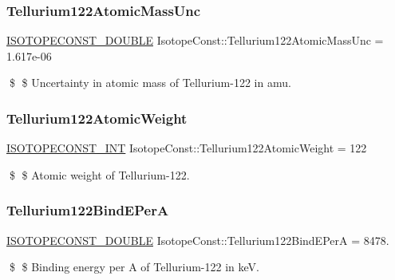 \subsubsection{\texorpdfstring{Tellurium122\+Atomic\+Mass\+Unc}{Tellurium122AtomicMassUnc}}
{\footnotesize\ttfamily \mbox{\hyperlink{group___isotope_const-_macros_ga8f45a7272ce02c0b4c65c44636ed719a}{I\+S\+O\+T\+O\+P\+E\+C\+O\+N\+S\+T\+\_\+\+D\+O\+U\+B\+LE}} Isotope\+Const\+::\+Tellurium122\+Atomic\+Mass\+Unc = 1.\+617e-\/06}

\$ \$ Uncertainty in atomic mass of Tellurium-\/122 in amu. \mbox{\label{group___isotope_const-_tellurium-_te122_ga1d44ab568306ae232658211d706b78d8}} 
\subsubsection{\texorpdfstring{Tellurium122\+Atomic\+Weight}{Tellurium122AtomicWeight}}
{\footnotesize\ttfamily \mbox{\hyperlink{group___isotope_const-_macros_ga5f18360b3e99483a35c32d789e62621c}{I\+S\+O\+T\+O\+P\+E\+C\+O\+N\+S\+T\+\_\+\+I\+NT}} Isotope\+Const\+::\+Tellurium122\+Atomic\+Weight = 122}

\$ \$ Atomic weight of Tellurium-\/122. \mbox{\label{group___isotope_const-_tellurium-_te122_ga313c3f61ba627eb232ff41265837904b}} 
\subsubsection{\texorpdfstring{Tellurium122\+Bind\+E\+PerA}{Tellurium122BindEPerA}}
{\footnotesize\ttfamily \mbox{\hyperlink{group___isotope_const-_macros_ga8f45a7272ce02c0b4c65c44636ed719a}{I\+S\+O\+T\+O\+P\+E\+C\+O\+N\+S\+T\+\_\+\+D\+O\+U\+B\+LE}} Isotope\+Const\+::\+Tellurium122\+Bind\+E\+PerA = 8478.}

\$ \$ Binding energy per A of Tellurium-\/122 in keV. \mbox{\label{group___isotope_const-_tellurium-_te122_ga72f835d72f3a542740a3b2089c831de9}} 
